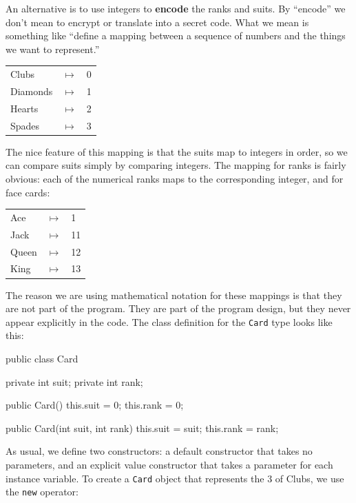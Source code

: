 \documentclass[12pt]{book}
\theoremstyle{exercise}
\newcommand{\java}[1]{\verb"#1"}
\newcommand{\java}[1]{\lstinline{#1}} %
\begin{document}

An alternative is to use integers to {\bf encode} the ranks and suits.
By ``encode'' we don't mean to encrypt or translate into a secret code.
What we mean is something like ``define a mapping between a sequence of numbers and the things we want to represent.''

\begin{tabular}{l c l}
Clubs & $\mapsto$ & 0 \\
Diamonds & $\mapsto$ & 1 \\
Hearts & $\mapsto$ & 2 \\
Spades & $\mapsto$ & 3
\end{tabular}

The nice feature of this mapping is that the suits map to integers in order, so we can compare suits simply by comparing integers.
The mapping for ranks is fairly obvious: each of the numerical ranks maps to the corresponding integer, and for face cards:

\begin{tabular}{l c l}
Ace & $\mapsto$ & 1 \\
Jack & $\mapsto$ & 11 \\
Queen & $\mapsto$ & 12 \\
King & $\mapsto$ & 13 \\
\end{tabular}

The reason we are using mathematical notation for these mappings is that they are not part of the program.
They are part of the program design, but they never appear explicitly in the code.
The class definition for the \java{Card} type looks like this:

\begin{code}
public class Card {
    private int suit;
    private int rank;

    public Card() {
        this.suit = 0;
        this.rank = 0;
    }

    public Card(int suit, int rank) {
        this.suit = suit;
        this.rank = rank;
    }
}
\end{code}


As usual, we define two constructors: a default constructor that takes no parameters, and an explicit value constructor that takes a parameter for each instance variable.
To create a \java{Card} object that represents the 3 of Clubs, we use the \java{new} operator:
\end{document}
